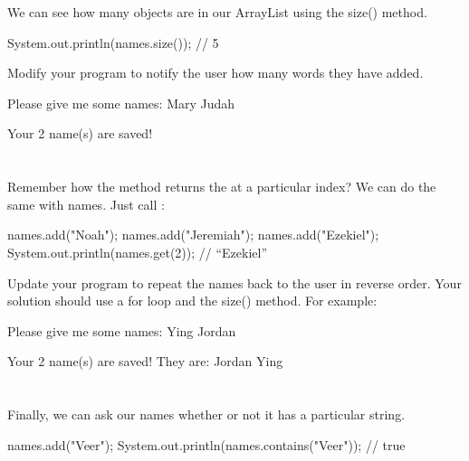 \noindent We can see how many objects are in our ArrayList using the size() method.

\begin{code}
System.out.println(names.size()); // 5
\end{code}

\begin{example}
Modify your program to notify the user how many words they have added.

\begin{monospace}
Please give me some names:
Mary
Judah

Your 2 name(s) are saved!
\end{monospace}
\end{example}

\section{}

Remember how the  method returns the  at a particular index? We can do the same with names. Just call :

\begin{code}
names.add("Noah");
names.add("Jeremiah");
names.add("Ezekiel");
System.out.println(names.get(2)); // ``Ezekiel''
\end{code}

\begin{example}
Update your program to repeat the names back to the user in reverse order. Your solution should use a for loop and the size() method. For example:

\begin{monospace}
Please give me some names:
Ying
Jordan

Your 2 name(s) are saved! They are:
Jordan
Ying
\end{monospace}
\end{example}

\section{}

Finally, we can ask our names  whether or not it has a particular string.

\begin{code}
names.add("Veer");
System.out.println(names.contains("Veer")); // true
\end{code}

